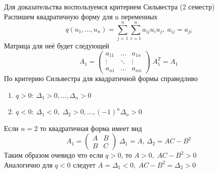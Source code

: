     \begin{Proof}
        Для доказательства воспользуемся критерием Сильвестра (2 семестр)\\
        Распишем квадратичную форму для n переменных
        \[
            q(u_1, \dots, u_n) = \sum_{j = 1}^n\sum_{i = 1}^n {a_{ij}u_iu_j}, \; a_{ij} = a_{ji}
        \]
        Матрица для неё будет следующей
        \[
            A_1 = \begin{pmatrix}
                      a_{11} & \dots & a_{1n} \\
                      \vdots & \ddots & \vdots \\
                      a_{n1} & \dots & a_{nn}
                  \end{pmatrix} \; A_1^T = A_1
        \]
        По критерию Сильвестра для квадратичной формы справедливо
        \begin{enumerate}
            \item $q > 0: \: \Delta_1 > 0, \dots, \Delta_n > 0$
            \item $q < 0: \: \Delta_1 < 0, \; \Delta_2 > 0, \dots, (-1)^n\Delta_n > 0$
        \end{enumerate}
        Если $n = 2$ то квадратичная форма имеет вид
        \[
            A_1 = \begin{pmatrix}
                    A & B \\
                    B & C
                   \end{pmatrix} \; \Delta_1 = A ,\, \Delta_2 = AC - B^2
        \]
        Таким образом очевидо что если $q > 0$, то $A > 0, \; AC-B^2 > 0$\\
        Аналогично для $q < 0$ следует $A = \Delta_1 < 0, \; AC-B^2 = \Delta_2 > 0$
        
    \end{Proof}
    
